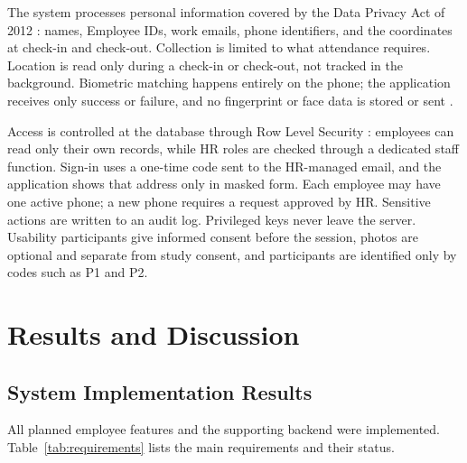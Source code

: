 \documentclass[conference]{IEEEtran}
\begin{document}
The system processes personal information covered by the Data Privacy
Act of 2012 \cite{ra10173}: names, Employee IDs, work emails, phone
identifiers, and the coordinates at check-in and check-out. Collection
is limited to what attendance requires. Location is read only during a
check-in or check-out, not tracked in the background. Biometric
matching happens entirely on the phone; the application receives only
success or failure, and no fingerprint or face data is stored or sent
\cite{androidbiometric,nist80063b}.

Access is controlled at the database through Row Level Security
\cite{postgresrls}: employees can read only their own records, while HR
roles are checked through a dedicated staff function. Sign-in uses a
one-time code sent to the HR-managed email, and the application shows
that address only in masked form. Each employee may have one active
phone; a new phone requires a request approved by HR. Sensitive actions
are written to an audit log. Privileged keys never leave the server.
Usability participants give informed consent before the session, photos
are optional and separate from study consent, and participants are
identified only by codes such as P1 and P2.


\section{Results and Discussion}

\subsection{System Implementation Results}

All planned employee features and the supporting backend were
implemented. Table~\ref{tab:requirements} lists the main requirements
and their status.
\end{document}
